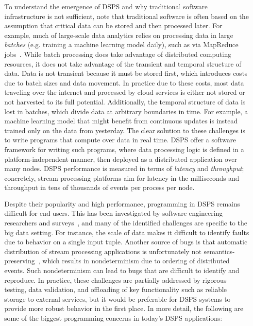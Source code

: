 To understand the emergence of DSPS and why traditional software infrastructure
is not sufficient, note that traditional software
is often based on the assumption that
critical data can be stored and then processed later.
For example,
much of large-scale data analytics relies on processing data in large
\emph{batches} (e.g. training a machine learning model daily),
such as via MapReduce jobs~\cite{dean2008mapreduce}.
While batch processing
does take advantage of distributed computing resources,
it does not take advantage of the transient and temporal structure of data.
Data is not transient because it must be stored first,
which introduces costs due to batch sizes and data movement.
In practice due to these costs, most data traveling over the internet
and processed by cloud services is either not stored or not harvested to its full potential.
Additionally, the temporal structure of data is lost in batches, which divide
data at arbitrary boundaries in time.
For example, a machine learning model that might benefit from continuous updates is instead trained only on the data from yesterday.
The clear solution to these challenges is to write programs that compute over data in real time.
DSPS offer a software framework for writing such programs, where data processing logic is defined in a platform-independent manner,
then deployed as a distributed application over many nodes.
DSPS performance is measured in terms of \emph{latency} and \emph{throughput};
concretely, stream processing platforms aim for latency in the milliseconds and throughput in tens of thousands of events per process per node.

Despite their popularity and high performance,
programming in DSPS remains difficult for end users.
This has been investigated by software engineering researchers
and surveys~\cite{gulzar2016bigdebug,fisher2012interactions,vianna2019exploratory},
and many of the identified challenges are specific to the big data setting.
For instance, the scale of data makes it difficult to identify faults due to behavior on a single input tuple.
Another source of bugs is that
automatic distribution of stream processing applications
is unfortunately not semantics-preserving~\cite{xiao2014nondeterminism,schneider2013safe,hirzel2014catalog},
which results in nondeterminism due to ordering of distributed events.
Such nondeterminism can lead to bugs that are difficult to identify and reproduce.
In practice, these challenges are partially addressed by rigorous testing, data validation, and offloading of key functionality such as reliable storage to external services, but it would be preferable for DSPS systems to provide more robust behavior in the first place.
In more detail, the following are some of the biggest programming concerns in today's DSPS applications:

